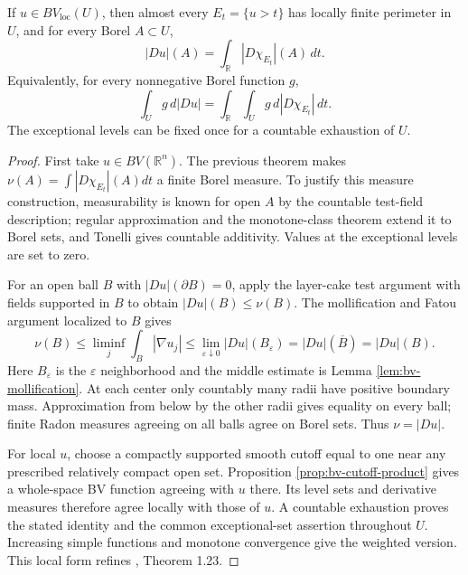 \begin{theorem}\label{thm:bv-coarea-local}
If $u\in BV_{\mathrm{loc}}(U)$, then almost every $E_t=\{u>t\}$ has locally finite perimeter in $U$, and for every Borel $A\subset U$,
\[
 |Du|(A)=\int_{\mathbb R}|D\chi_{E_t}|(A)\,dt.
\]
Equivalently, for every nonnegative Borel function $g$,
\[
 \int_Ug\,d|Du|
 =\int_{\mathbb R}\int_Ug\,d|D\chi_{E_t}|\,dt.
\]
The exceptional levels can be fixed once for a countable exhaustion of $U$.
\end{theorem}
\begin{proof}
First take $u\in BV(\mathbb R^n)$. The previous theorem makes
$\nu(A)=\int|D\chi_{E_t}|(A)dt$ a finite Borel measure. To justify this measure construction, measurability is known for open $A$ by the countable test-field description; regular approximation and the monotone-class theorem extend it to Borel sets, and Tonelli gives countable additivity. Values at the exceptional levels are set to zero.

For an open ball $B$ with $|Du|(\partial B)=0$, apply the layer-cake test argument with fields supported in $B$ to obtain $|Du|(B)\leq\nu(B)$. The mollification and Fatou argument localized to $B$ gives
\[
 \nu(B)\leq\liminf_j\int_B|\nabla u_j|
 \leq\lim_{\varepsilon\downarrow0}|Du|(B_\varepsilon)
 =|Du|(\overline B)=|Du|(B).
\]
Here $B_\varepsilon$ is the $\varepsilon$ neighborhood and the middle estimate is Lemma \ref{lem:bv-mollification}. At each center only countably many radii have positive boundary mass. Approximation from below by the other radii gives equality on every ball; finite Radon measures agreeing on all balls agree on Borel sets. Thus $\nu=|Du|$.

For local $u$, choose a compactly supported smooth cutoff equal to one near any prescribed relatively compact open set. Proposition \ref{prop:bv-cutoff-product} gives a whole-space BV function agreeing with $u$ there. Its level sets and derivative measures therefore agree locally with those of $u$. A countable exhaustion proves the stated identity and the common exceptional-set assertion throughout $U$. Increasing simple functions and monotone convergence give the weighted version. This local form refines \cite{Giu84}, Theorem 1.23.
\end{proof}

